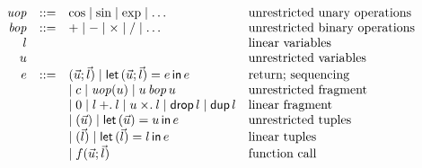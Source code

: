\[\begin{array}{rcll}
\mathit{uop} & ::= &
  \cos \mid \sin \mid \exp \mid \ldots
  & \text{unrestricted unary operations}
\\
\mathit{bop} & ::= &
  \mathord{+} \mid \mathord{-} \mid \mathord{\times} \mid \mathord{/} \mid \ldots
  & \text{unrestricted binary operations}
\\
l & & & \text{linear variables} \\
u & & & \text{unrestricted variables} \\
e & ::= &
  (\vec{u}; \vec{l})
\mid
  \mathsf{let}\,(\vec{u};\vec{l})=e\,\mathsf{in}\,e
  & \text{return; sequencing}
\\&&
\mid
  c
\mid
  \mathit{uop}(u)
\mid
  u\mathop{\mathit{bop}}u
  & \text{unrestricted fragment}
\\&&
\mid
  0
\mid
  l\mathbin{+.}l
\mid
  u\mathbin{\times.}l
\mid
  \mathsf{drop}\,l
\mid
  \mathsf{dup}\,l
  & \text{linear fragment}
\\&&
\mid
  (\vec{u})
\mid
  \mathsf{let}\,(\vec{u})=u\,\mathsf{in}\,e
  & \text{unrestricted tuples}
\\&&
\mid
  (\vec{l})
\mid
  \mathsf{let}\,(\vec{l})=l\,\mathsf{in}\,e
  & \text{linear tuples}
\\&&
\mid
  f(\vec{u};\vec{l})
  & \text{function call}
\end{array}\]
